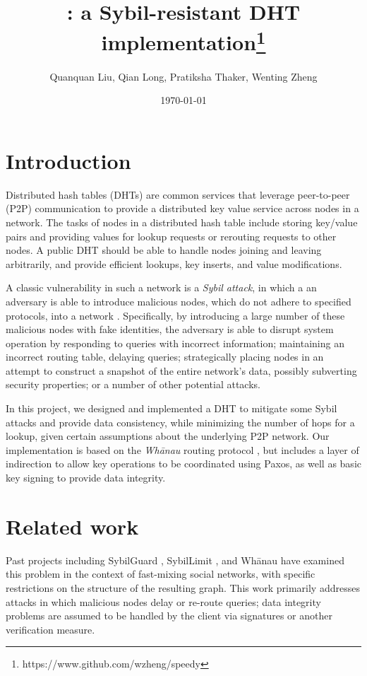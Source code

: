 \documentclass[letter]{article}
\title{\sys: a Sybil-resistant DHT implementation\footnote{https://www.github.com/wzheng/speedy}}
\author{Quanquan Liu, Qian Long, Pratiksha Thaker, Wenting Zheng}
\date{\today}
\begin{document}
\maketitle

\section{Introduction}

Distributed hash tables (DHTs) are common services that leverage peer-to-peer
(P2P) communication to provide a distributed key value service across nodes in a
network. The tasks of nodes in a distributed hash table include storing
key/value pairs and providing values for lookup requests or rerouting requests
to other nodes. A public DHT should be able to handle nodes joining and leaving
arbitrarily, and provide efficient lookups, key inserts, and value
modifications.

A classic vulnerability in such a network is a \textit{Sybil attack}, in
which a an adversary is able to introduce malicious nodes, which
do not adhere to specified
protocols, into a network . Specifically,
by introducing a large number of these malicious nodes with fake identities,
the adversary is able to
disrupt system operation by responding to queries with incorrect information;
maintaining an incorrect routing table, delaying queries;
strategically placing nodes in an attempt to construct a snapshot of the
entire network's data, possibly subverting security properties; or a
number of other potential attacks.

In this project, we designed and implemented a DHT to mitigate some
Sybil attacks and provide data consistency, while minimizing the number of hops
for a lookup, given certain assumptions about the underlying P2P network.
Our implementation is based on the \textit{Wh\={a}nau} routing protocol
\cite{whanau}, but includes a layer of indirection to allow key operations
to be coordinated using Paxos, as well as basic key signing to provide
data integrity.

\section{Related work}

Past projects including SybilGuard \cite{sybilguard}, SybilLimit \cite{sybillimit},
and Wh\={a}nau \cite{whanau} have examined this problem in the context
of fast-mixing social networks, with specific restrictions on the
structure of the resulting graph. This work primarily addresses attacks
in which malicious nodes delay or re-route queries; data integrity
problems are assumed to be handled by the client via signatures or another
verification measure.\\
\end{document}

